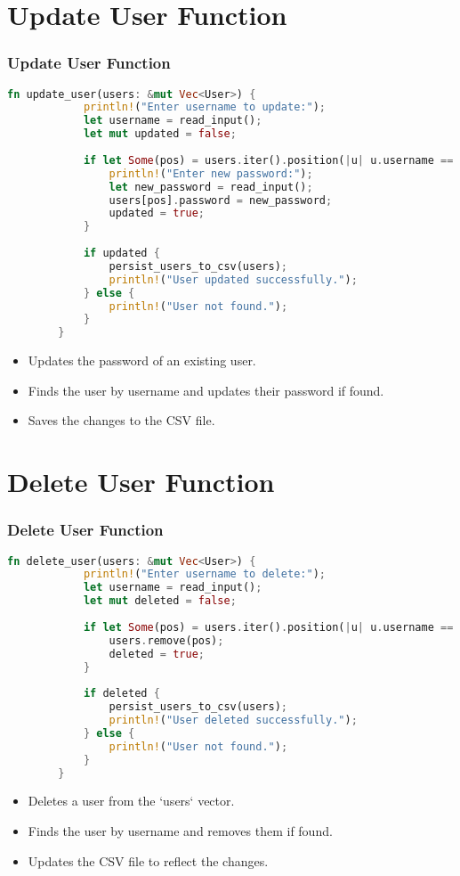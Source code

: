 \documentclass[aspectratio=169, table]{beamer}
\begin{document}
\section{Update User Function}
\begin{frame}[fragile]
	\frametitle{Update User Function}
	\begin{lstlisting}[language=Rust]
		fn update_user(users: &mut Vec<User>) {
			println!("Enter username to update:");
			let username = read_input();
			let mut updated = false;
			
			if let Some(pos) = users.iter().position(|u| u.username == username) {
				println!("Enter new password:");
				let new_password = read_input();
				users[pos].password = new_password;
				updated = true;
			}
			
			if updated {
				persist_users_to_csv(users);
				println!("User updated successfully.");
			} else {
				println!("User not found.");
			}
		}
	\end{lstlisting}
	\begin{itemize}
		\item Updates the password of an existing user.
		\item Finds the user by username and updates their password if found.
		\item Saves the changes to the CSV file.
	\end{itemize}
\end{frame}

\section{Delete User Function}
\begin{frame}[fragile]
	\frametitle{Delete User Function}
	\begin{lstlisting}[language=Rust]
		fn delete_user(users: &mut Vec<User>) {
			println!("Enter username to delete:");
			let username = read_input();
			let mut deleted = false;
			
			if let Some(pos) = users.iter().position(|u| u.username == username) {
				users.remove(pos);
				deleted = true;
			}
			
			if deleted {
				persist_users_to_csv(users);
				println!("User deleted successfully.");
			} else {
				println!("User not found.");
			}
		}
	\end{lstlisting}
	\begin{itemize}
		\item Deletes a user from the `users` vector.
		\item Finds the user by username and removes them if found.
		\item Updates the CSV file to reflect the changes.
	\end{itemize}
\end{frame}
\end{document}
